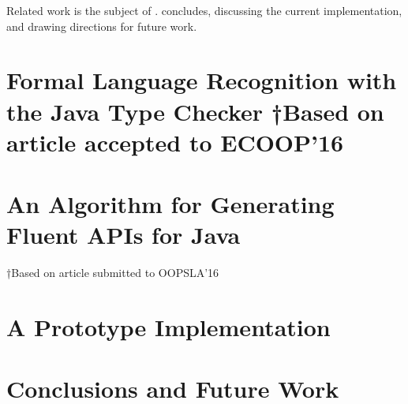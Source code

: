 \documentclass[12pt]{book}
\begin{document}
Related work is the subject of .
concludes, discussing the current implementation, and drawing
directions for future
work.

\chapter{Formal Language Recognition with the Java Type Checker
†{Based on article accepted to ECOOP'16~\protect\cite{Gil:Levy:2016}}}
\label{chapter:ecoop}


\chapter{An Algorithm for Generating Fluent APIs for Java}
†{Based on article submitted to OOPSLA'16~\cite{Gil:Levy:2016a}}
\label{chapter:oopsla}


\chapter{A Prototype Implementation}
\label{chapter:tokens}
%

\chapter{Conclusions and Future Work}
\label{chapter:conclusions}





\end{document}
